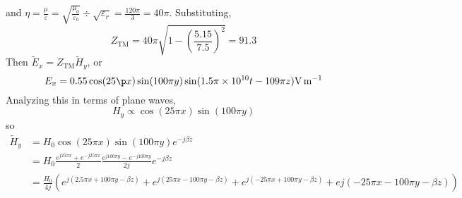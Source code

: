 \documentclass[12pt]{article}
\begin{document}
\begin{ex}
    and $\eta = \frac{\mu}{\varepsilon} = \sqrt{\frac{\mu_0}{\varepsilon_0}} \div \sqrt{\varepsilon_r} = \frac{120\pi}{3} = 40\pi$. Substituting,
    $$Z_{\text{TM}} = 40\pi\sqrt{1 - \left(\frac{5.15}{7.5}\right)^2} = 91.3$$
    Then $\tilde E_x = Z_{\text{TM}}\tilde H_y$, or
    $$E_x = 0.55 \cos(25\p x)\sin(100\pi y)\sin(1.5\pi \times 10^{10}t - 109\pi z)\unit{V.m^{-1}}$$
    Analyzing this in terms of plane waves,
    $$H_y \propto \cos(25\pi x)\sin(100\pi y)$$
    so
    \begin{align*}
        \tilde H_y &= H_0\cos(25\pi x)\sin(100\pi y)e^{-j\beta z} \\
                   &= H_0 \frac{e^{j25\pi x} + e^{-j25\pi x}}{2} \frac{e^{j100\pi y} - e^{-j100\pi y}}{2j} e^{-j\beta z} \\
                   &= \frac{H_0}{4j} \left(e^{j(2.5\pi x + 100\pi y - \beta z)} + e^{j(25\pi x - 100\pi y - \beta z)} + e^{j(-25\pi x + 100\pi y - \beta z)} + e{j(-25\pi x - 100\pi y - \beta z)}\right)
    \end{align*}
\end{ex}
\end{document}
